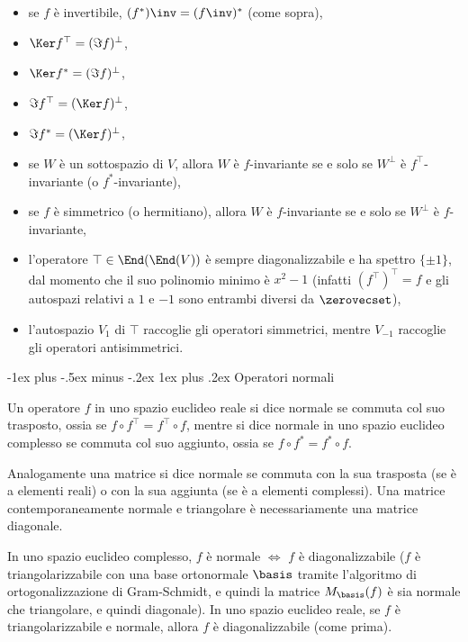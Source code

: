 \documentclass[10pt,landscape]{article}
\makeatletter
\renewcommand{\subsubsection}{\@startsection{subsubsection}{3}{0mm}%
	{-1ex plus -.5ex minus -.2ex}%
	{1ex plus .2ex}%
	{\normalfont\small\bfseries}}
\makeatother
\begin{document}
\begin{multicols}{3}
\begin{itemize}
			\item se $f$ è invertibile, $(f^*)\inv = (f\inv)^*$ (come sopra),
			\item $\Ker f^\top = (\Im f)^\perp$,
			\item $\Ker f^* = (\Im f)^\perp$,
			\item $\Im f^\top = (\Ker f)^\perp$,
			\item $\Im f^* = (\Ker f)^\perp$,
			\item se $W$ è un sottospazio di $V$, allora $W$ è $f$-invariante se e solo
			se $W^\perp$ è $f^\top$-invariante (o $f^*$-invariante),
			\item se $f$ è simmetrico (o hermitiano), allora $W$ è $f$-invariante se e solo se $W^\perp$ è $f$-invariante,
			\item l'operatore $\top \in \End(\End(V))$ è sempre diagonalizzabile
			e ha spettro $\{\pm 1\}$, dal momento che il suo polinomio minimo è $x^2-1$ (infatti $(f^\top)^\top = f$ e gli autospazi relativi a $1$ e $-1$ sono entrambi diversi da $\zerovecset$),
			\item l'autospazio $V_1$ di $\top$ raccoglie gli operatori simmetrici, mentre
			$V_{-1}$ raccoglie gli operatori antisimmetrici.
		\end{itemize}

		\subsubsection{Operatori normali}
		
		Un operatore $f$ in uno spazio euclideo reale
		si dice normale se commuta col suo trasposto,
		ossia se $f \circ f^\top = f^\top \circ f$, mentre
		si dice normale in uno spazio euclideo complesso
		se commuta col suo aggiunto, ossia se $f \circ f^* = f^* \circ f$. \\ \vskip 0.05in
		
		Analogamente una matrice si dice
		normale se commuta con la sua trasposta (se è a elementi reali) o con la sua aggiunta (se è a elementi complessi). Una matrice contemporaneamente
		normale e triangolare è necessariamente una matrice
		diagonale. \\ \vskip 0.05in
		
		In uno spazio euclideo complesso, $f$ è normale $\iff$ $f$ è diagonalizzabile ($f$ è triangolarizzabile con una base ortonormale $\basis$ tramite
		l'algoritmo di ortogonalizzazione di Gram-Schmidt, e quindi la matrice $M_\basis(f)$ è sia normale che
		triangolare, e quindi diagonale). In uno spazio
		euclideo reale, se $f$ è triangolarizzabile e
		normale, allora $f$ è diagonalizzabile (come prima).
		

\end{multicols}
\end{document}
